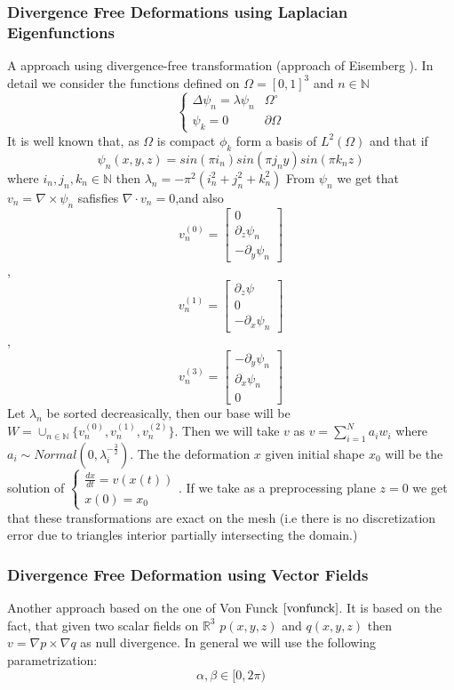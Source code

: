 \documentclass{article}
\begin{document}
\subsubsection{Divergence Free Deformations using Laplacian Eigenfunctions}
A approach using divergence-free transformation (approach of Eisemberg \cite{eisemberg}). In detail we consider the functions defined on $\Omega =[0,1]^{3}$ and $n \in \mathbb{N}$\\
$$\begin{cases}
\Delta \psi_{n}=\lambda \psi_{n} & \Omega^{\circ} \\
\psi_{k}=0 & \partial\Omega
\end{cases}$$	
It is well known that, as $\Omega$ is compact $\phi_{k}$ form a basis of $L^{2}(\Omega)$ and that if $$\psi_{n}(x,y,z)=sin(\pi i_{n}) sin(\pi j_{n} y)sin(\pi k_{n}z)$$
where $i_{n},j_{n},k_{n}\in\mathbb{N}$ then $\lambda_{n}=-\pi^{2}(i_{n}^{2}+j_{n}^{2}+k_{n}^{2})$
From $\psi_{n}$ we get that $v_{n}=\nabla \times \psi_{n}$ safisfies $\nabla \cdot v_{n}=0$,and also $$v_{n}^{(0)}=\begin{bmatrix} 0 \\ \partial_{z}\psi_{n} \\ -\partial_{y}\psi_{n}\end{bmatrix}$$, $$v_{n}^{(1)}=\begin{bmatrix} \partial_{z}\psi \\ 0 \\ -\partial_{x}\psi_{n} \end{bmatrix}$$,
$$v_{n}^{(3)}=\begin{bmatrix} -\partial_{y}\psi_{n} \\ \partial_{x}\psi_{n} \\ 0 \end{bmatrix}$$
Let $\lambda_{n}$ be sorted decreasically, then our base will be $W=\cup_{n \in \mathbb{N}}\{v_{n}^{(0)},v_{n}^{(1)},v_{n}^{(2)}\}$.
Then we will take $v$ as $v=\sum_{i=1}^{N}a_{i}w_{i}$ where $a_{i}\sim Normal(0,\lambda_{i}^{-\frac{3}{2}})$. The the deformation $x$ given initial shape $x_{0}$ will be the solution of $\begin{cases} \frac{dx}{dt}=v(x(t)) \\ x(0)=x_{0} \end{cases}$.
If we take as a preprocessing plane $z=0$ we get that these transformations are exact on the mesh (i.e there is no discretization error due to triangles interior partially intersecting the domain.)
\subsubsection{Divergence Free Deformation using Vector Fields}
Another approach based on the one of Von Funck $\cite{vonfunck}$.
It is based on the fact, that given two scalar fields on $\mathbb{R}^{3}$ $p(x,y,z)$ and $q(x,y,z)$ then $v=\nabla p \times \nabla q$ as null divergence.
In general we will use the following parametrization:
$$\alpha,\beta \in [0,2\pi)$$ 
\end{document}
